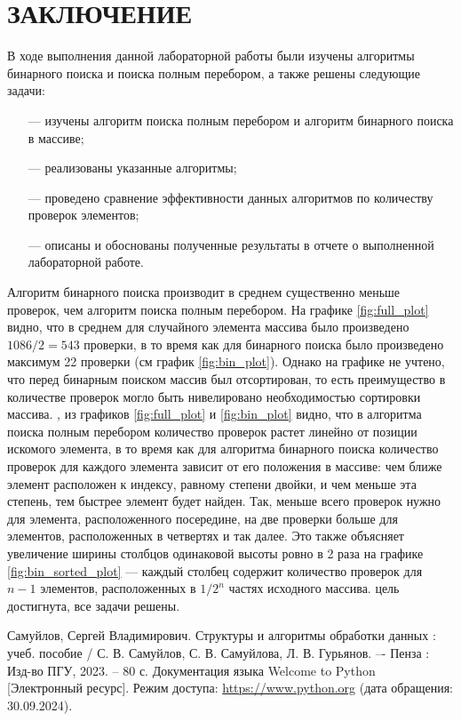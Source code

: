 \documentclass{bmstu}
\begin{document}
\chapter*{ЗАКЛЮЧЕНИЕ}

В ходе выполнения данной лабораторной работы были изучены алгоритмы бинарного поиска и поиска полным перебором, а также решены следующие задачи:
\begin{itemize}
	\item[---] изучены алгоритм поиска полным перебором и алгоритм бинарного поиска в массиве;
	\item[---] реализованы указанные алгоритмы;
	\item[---] проведено сравнение эффективности данных алгоритмов по количеству проверок элементов;
        \item[---] описаны и обоснованы полученные результаты в отчете о выполненной лабораторной работе.
\end{itemize}

Алгоритм бинарного поиска производит в среднем существенно меньше проверок, чем алгоритм поиска полным перебором. На графике \ref{fig:full_plot} видно, что в среднем для случайного элемента массива было произведено $1086 / 2 = 543$ проверки, в то время как для бинарного поиска было произведено максимум 22 проверки (см график \ref{fig:bin_plot}). Однако на графике не учтено, что перед бинарным поиском массив был отсортирован, то есть преимущество в количестве проверок могло быть нивелировано необходимостью сортировки массива.
, из графиков \ref{fig:full_plot} и \ref{fig:bin_plot} видно, что в алгоритма поиска полным перебором количество проверок растет линейно от позиции искомого элемента, в то время как для алгоритма бинарного поиска количество проверок для каждого элемента зависит от его положения в массиве: чем ближе элемент расположен к индексу, равному степени двойки, и чем меньше эта степень, тем быстрее элемент будет найден. Так, меньше всего проверок нужно для элемента, расположенного посередине, на две проверки больше для элементов, расположенных в четвертях и так далее. Это также объясняет увеличение ширины столбцов одинаковой высоты ровно в 2 раза на графике \ref{fig:bin_sorted_plot} --- каждый столбец содержит количество проверок для $n - 1$ элементов, расположенных в $1 / 2^{n}$ частях исходного массива.
 цель достигнута, все задачи решены.

\vspace{5mm}

\renewcommand{\bibname}{СПИСОК ИСПОЛЬЗОВАННЫХ ИСТОЧНИКОВ}
\begin{thebibliography}{5}
	Самуйлов, Сергей Владимирович.
Структуры и алгоритмы обработки данных : учеб. пособие / С. В. Самуйлов, С. В. Самуйлова, Л. В. Гурьянов. –-
Пенза : Изд-во ПГУ, 2023. – 80 с.
	Документация языка Welcome to Python [Электронный ресурс]. Режим доступа: \url{https://www.python.org} (дата обращения: 30.09.2024).
\end{thebibliography}

\end{document}
